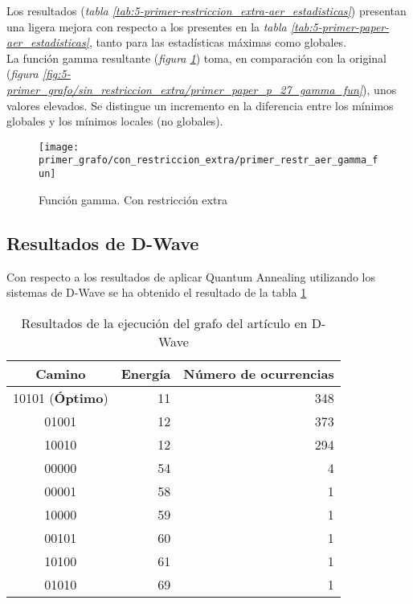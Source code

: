 \documentclass{article}
\begin{document}
Los resultados (\textit{tabla \ref{tab:5-primer-restriccion_extra-aer_estadisticas}}) presentan una ligera mejora con respecto a los presentes en la \textit{tabla \ref{tab:5-primer-paper-aer_estadisticas}}, tanto para las estadísticas máximas como globales. \\

La función gamma resultante (\textit{figura \ref{fig:5-primer_grafo/con_restriccion_extra/primer_restr_aer_gamma_fun}}) toma, en comparación con la original (\textit{figura \ref{fig:5-primer_grafo/sin_restriccion_extra/primer_paper_p_27_gamma_fun}}), unos valores elevados. Se distingue un incremento en la diferencia entre los mínimos globales y los mínimos locales (no globales).
\begin{figure}[htbp]
  \centering
  \texttt{[image: primer\_grafo/con\_restriccion\_extra/primer\_restr\_aer\_gamma\_fun]}
  \caption{Función gamma. Con restricción extra} \label{fig:5-primer_grafo/con_restriccion_extra/primer_restr_aer_gamma_fun}
\end{figure}
  
\newpage{}
\subsection{Resultados de D-Wave}
Con respecto a los resultados de aplicar Quantum Annealing utilizando los sistemas de D-Wave se ha obtenido el resultado de la tabla \ref{tab:5-primer-dwave_estadisticas}

\begin{table}[htbp]
  \centering
  \begin{tabular}{|c|r|r|}
    \hline
    \textbf{Camino} & \textbf{Energía} & \textbf{Número de ocurrencias} \\ \hline
    10101 (\textbf{Óptimo}) & 11 & 348 \\ \hline
    01001 & 12 & 373 \\ \hline
    10010 & 12 & 294 \\ \hline
    00000 & 54 &   4 \\ \hline
    00001 & 58 &   1 \\ \hline
    10000 & 59 &   1 \\ \hline
    00101 & 60 &   1 \\ \hline
    10100 & 61 &   1 \\ \hline
    01010 & 69 &   1 \\ \hline
  \end{tabular}
  \caption{Resultados de la ejecución del grafo del artículo en D-Wave}
  \label{tab:5-primer-dwave_estadisticas}
\end{table}
\end{document}

